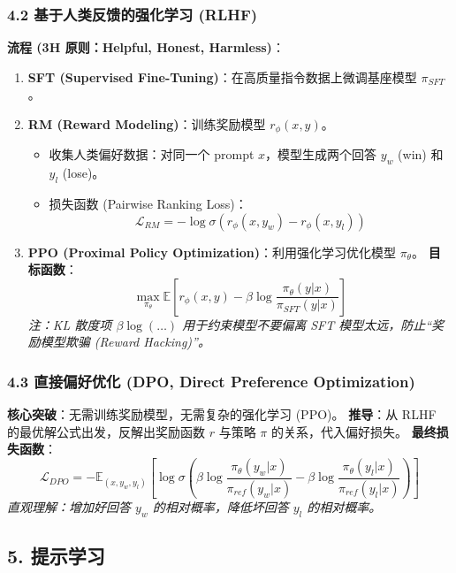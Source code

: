 \documentclass[a4paper, 11pt]{ctexart}
\begin{document}
\subsubsection{4.2 基于人类反馈的强化学习 (RLHF)}
\textbf{流程 (3H 原则：Helpful, Honest, Harmless)}：
\begin{enumerate}
    \item \textbf{SFT (Supervised Fine-Tuning)}：在高质量指令数据上微调基座模型 $\pi_{SFT}$。
    \item \textbf{RM (Reward Modeling)}：训练奖励模型 $r_\phi(x, y)$。
    \begin{itemize}
        \item 收集人类偏好数据：对同一个 prompt $x$，模型生成两个回答 $y_w$ (win) 和 $y_l$ (lose)。
        \item 损失函数 (Pairwise Ranking Loss)：
        $$ \mathcal{L}_{RM} = - \log \sigma(r_\phi(x, y_w) - r_\phi(x, y_l)) $$
    \end{itemize}
    \item \textbf{PPO (Proximal Policy Optimization)}：利用强化学习优化模型 $\pi_\theta$。
    \textbf{目标函数}：
    $$ \max_{\pi_\theta} \mathbb{E} [r_\phi(x, y) - \beta \log \frac{\pi_\theta(y|x)}{\pi_{SFT}(y|x)}] $$
    \textit{注：KL 散度项 $\beta \log (\dots)$ 用于约束模型不要偏离 SFT 模型太远，防止“奖励模型欺骗 (Reward Hacking)”。}
\end{enumerate}

\subsubsection{4.3 直接偏好优化 (DPO, Direct Preference Optimization)}
\textbf{核心突破}：无需训练奖励模型，无需复杂的强化学习 (PPO)。
\textbf{推导}：从 RLHF 的最优解公式出发，反解出奖励函数 $r$ 与策略 $\pi$ 的关系，代入偏好损失。
\textbf{最终损失函数}：
\begin{equation}
    \mathcal{L}_{DPO} = - \mathbb{E}_{(x, y_w, y_l)} \left[ \log \sigma \left( \beta \log \frac{\pi_\theta(y_w|x)}{\pi_{ref}(y_w|x)} - \beta \log \frac{\pi_\theta(y_l|x)}{\pi_{ref}(y_l|x)} \right) \right]
\end{equation}
\textit{直观理解：增加好回答 $y_w$ 的相对概率，降低坏回答 $y_l$ 的相对概率。}

\subsection{5. 提示学习}
\end{document}
